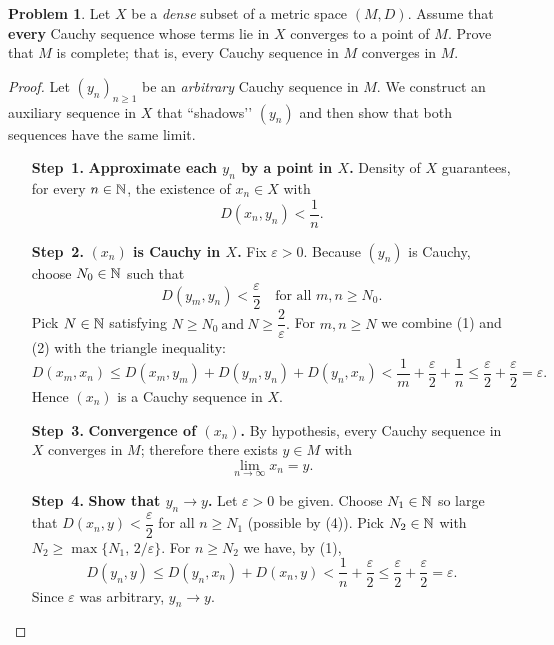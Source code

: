 \documentclass[12pt]{article}
\theoremstyle{definition} %
\newtheorem{problem}{Problem}
\theoremstyle{plain} %
\begin{document}
\begin{problem}
  Let $X$ be a \emph{dense} subset of a metric space $(M,D)$.  
  Assume that \textbf{every} Cauchy sequence whose terms lie in $X$
  converges to a point of $M$.  
  Prove that $M$ is complete; that is, every Cauchy sequence in $M$
  converges in $M$.
\end{problem}

\begin{proof}
  Let $(y_n)_{n\ge1}$ be an \emph{arbitrary} Cauchy sequence in $M$.  
  We construct an auxiliary sequence in $X$ that “shadows’’ $(y_n)$ and
  then show that both sequences have the same limit.

  \begin{enumerate}
      \item[\textbf{Step 1.}] \textbf{Approximate each $y_n$ by a point in $X$.}  
            Density of $X$ guarantees, for every $n\in\Bbb N$,  
            the existence of $x_n\in X$ with
            \[
                D(x_n,y_n)<\frac1n. \tag{1}
            \]

      \item[\textbf{Step 2.}] \textbf{$(x_n)$ is Cauchy in $X$.}  
            Fix $\varepsilon>0$.  
            Because $(y_n)$ is Cauchy, choose $N_0\in\Bbb N$ such that
            \[
                D(y_m,y_n)<\frac{\varepsilon}{2}
                \quad\text{for all }m,n\ge N_0. \tag{2}
            \]
            Pick $N\in\Bbb N$ satisfying
            \(
                N\ge N_0\ \text{and}\ N\ge\dfrac{2}{\varepsilon}. 
            \)
            For $m,n\ge N$ we combine (1) and (2) with the triangle
            inequality:
            \[
                D(x_m,x_n)
                \le D(x_m,y_m)+D(y_m,y_n)+D(y_n,x_n)
                <\frac1m+\frac{\varepsilon}{2}+\frac1n
                \le\frac{\varepsilon}{2}+\frac{\varepsilon}{2}
                =\varepsilon.
            \]
            Hence $(x_n)$ is a Cauchy sequence in $X$.

      \item[\textbf{Step 3.}] \textbf{Convergence of $(x_n)$.}  
            By hypothesis, every Cauchy sequence in $X$ converges in $M$;
            therefore there exists $y\in M$ with
            \[
                \lim_{n\to\infty}x_n=y. \tag{4}
            \]

      \item[\textbf{Step 4.}] \textbf{Show that $y_n\to y$.}  
            Let $\varepsilon>0$ be given.  
            Choose $N_1\in\Bbb N$ so large that
            \(
                D(x_n,y)<\dfrac{\varepsilon}{2}
            \)
            for all $n\ge N_1$ (possible by (4)).
            Pick $N_2\in\Bbb N$ with $N_2\ge\max\{N_1,\,2/\varepsilon\}$.
            For $n\ge N_2$ we have, by (1),
            \[
                D(y_n,y)
                \le D(y_n,x_n)+D(x_n,y)
                <\frac1n+\frac{\varepsilon}{2}
                \le\frac{\varepsilon}{2}+\frac{\varepsilon}{2}
                =\varepsilon.
            \]
            Since $\varepsilon$ was arbitrary, $y_n\to y$.


\end{enumerate}
\end{proof}
\end{document}
